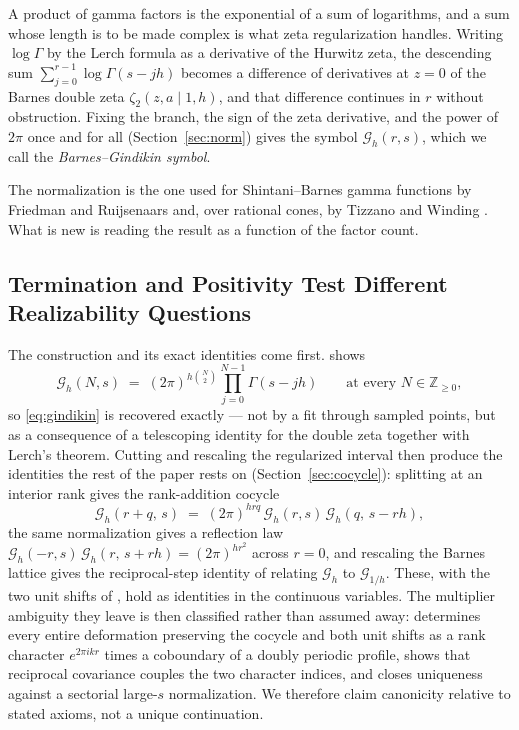 \documentclass[11pt,letterpaper]{article}
\newcommand{\Gc}{\mathcal{G}}               %
\newcommand{\Zt}{\zeta_2}
\newcommand{\Zint}{\mathbb{Z}}
\begin{document}
A product of gamma factors is the exponential of a sum of logarithms, and a sum
whose length is to be made complex is what zeta regularization handles. Writing
$\log\Gamma$ by the Lerch formula as a derivative of the Hurwitz zeta, the
descending sum $\sum_{j=0}^{r-1}\log\Gamma(s-jh)$ becomes a difference of
derivatives at $z=0$ of the Barnes double zeta $\Zt(z,a\mid 1,h)$, and that
difference continues in $r$ without obstruction. Fixing the branch, the sign of
the zeta derivative, and the power of $2\pi$ once and for all
(Section~\ref{sec:norm}) gives the symbol $\Gc_h(r,s)$, which we call the
\emph{Barnes--Gindikin symbol}.

The normalization is the one used for Shintani--Barnes gamma functions by
Friedman and Ruijsenaars \cite{FR} and, over rational cones, by Tizzano and
Winding \cite{TW,Winding}. What is new is reading the result as a function of
the factor count.

\subsection{Termination and Positivity Test Different Realizability Questions}

The construction and its exact identities come first.  shows
\begin{equation*}
  \Gc_h(N,s)\;=\;(2\pi)^{h\binom{N}{2}}\prod_{j=0}^{N-1}\Gamma(s-jh)
  \qquad\text{at every } N\in\Zint_{\ge0},
\end{equation*}
so \eqref{eq:gindikin} is recovered exactly --- not
by a fit through sampled points, but as a consequence of a telescoping identity
for the double zeta together with Lerch's theorem. Cutting and rescaling the
regularized interval then produce the identities the rest of the paper rests on
(Section~\ref{sec:cocycle}): splitting at an interior rank gives the rank-addition
cocycle
\begin{equation}
  \Gc_h(r+q,\,s)\;=\;(2\pi)^{h r q}\,\Gc_h(r,s)\,\Gc_h(q,\,s-rh),
  \label{eq:cocycle-intro}
\end{equation}
the same normalization gives a reflection law
$\Gc_h(-r,s)\,\Gc_h(r,\,s+rh)=(2\pi)^{h r^2}$ across $r=0$, and rescaling the
Barnes lattice gives the reciprocal-step identity of  relating
$\Gc_h$ to $\Gc_{1/h}$. These, with the two unit shifts of , hold
as identities in the continuous variables. The multiplier ambiguity they leave is
then classified rather than assumed away:  determines every
entire deformation preserving the cocycle and both unit shifts as a rank
character $e^{2\pi ikr}$ times a coboundary of a doubly periodic profile,
 shows that reciprocal covariance couples the two character
indices, and  closes uniqueness against a sectorial large-$s$
normalization. We therefore claim canonicity relative to stated axioms, not a
unique continuation.
\end{document}
